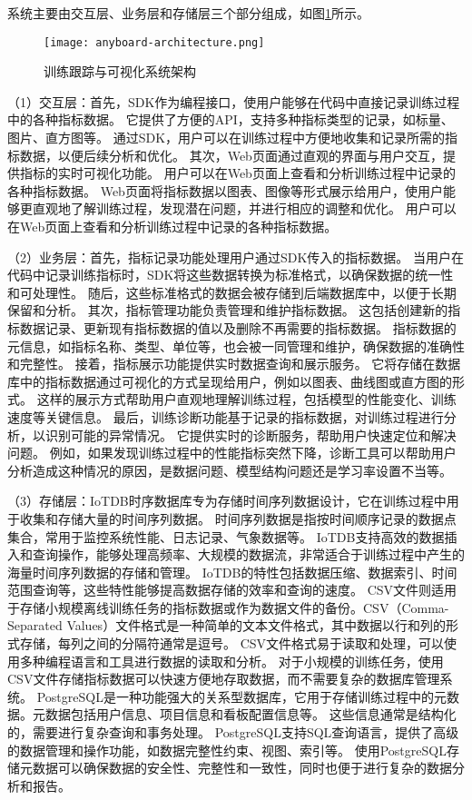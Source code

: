 系统主要由交互层、业务层和存储层三个部分组成，如图\ref{fig:anyboardarch}所示。

\begin{figure}
  \centering
  \texttt{[image: anyboard-architecture.png]}
  \caption{训练跟踪与可视化系统架构}
  \label{fig:anyboardarch}
\end{figure}

（1）交互层：首先，SDK作为编程接口，使用户能够在代码中直接记录训练过程中的各种指标数据。
它提供了方便的API，支持多种指标类型的记录，如标量、图片、直方图等。
通过SDK，用户可以在训练过程中方便地收集和记录所需的指标数据，以便后续分析和优化。
其次，Web页面通过直观的界面与用户交互，提供指标的实时可视化功能。
用户可以在Web页面上查看和分析训练过程中记录的各种指标数据。
Web页面将指标数据以图表、图像等形式展示给用户，使用户能够更直观地了解训练过程，发现潜在问题，并进行相应的调整和优化。
用户可以在Web页面上查看和分析训练过程中记录的各种指标数据。

（2）业务层：首先，指标记录功能处理用户通过SDK传入的指标数据。
当用户在代码中记录训练指标时，SDK将这些数据转换为标准格式，以确保数据的统一性和可处理性。
随后，这些标准格式的数据会被存储到后端数据库中，以便于长期保留和分析。
其次，指标管理功能负责管理和维护指标数据。
这包括创建新的指标数据记录、更新现有指标数据的值以及删除不再需要的指标数据。
指标数据的元信息，如指标名称、类型、单位等，也会被一同管理和维护，确保数据的准确性和完整性。
接着，指标展示功能提供实时数据查询和展示服务。
它将存储在数据库中的指标数据通过可视化的方式呈现给用户，例如以图表、曲线图或直方图的形式。
这样的展示方式帮助用户直观地理解训练过程，包括模型的性能变化、训练速度等关键信息。
最后，训练诊断功能基于记录的指标数据，对训练过程进行分析，以识别可能的异常情况。
它提供实时的诊断服务，帮助用户快速定位和解决问题。
例如，如果发现训练过程中的性能指标突然下降，诊断工具可以帮助用户分析造成这种情况的原因，是数据问题、模型结构问题还是学习率设置不当等。

（3）存储层：IoTDB时序数据库\cite{Wan23}专为存储时间序列数据设计，它在训练过程中用于收集和存储大量的时间序列数据。
时间序列数据是指按时间顺序记录的数据点集合，常用于监控系统性能、日志记录、气象数据等。
IoTDB支持高效的数据插入和查询操作，能够处理高频率、大规模的数据流，非常适合于训练过程中产生的海量时间序列数据的存储和管理。
IoTDB的特性包括数据压缩、数据索引、时间范围查询等，这些特性能够提高数据存储的效率和查询的速度。
CSV文件则适用于存储小规模离线训练任务的指标数据或作为数据文件的备份。CSV（Comma-Separated Values）文件格式是一种简单的文本文件格式，其中数据以行和列的形式存储，每列之间的分隔符通常是逗号。
CSV文件格式易于读取和处理，可以使用多种编程语言和工具进行数据的读取和分析。
对于小规模的训练任务，使用CSV文件存储指标数据可以快速方便地存取数据，而不需要复杂的数据库管理系统。
PostgreSQL是一种功能强大的关系型数据库，它用于存储训练过程中的元数据。元数据包括用户信息、项目信息和看板配置信息等。
这些信息通常是结构化的，需要进行复杂查询和事务处理。
PostgreSQL支持SQL查询语言，提供了高级的数据管理和操作功能，如数据完整性约束、视图、索引等。
使用PostgreSQL存储元数据可以确保数据的安全性、完整性和一致性，同时也便于进行复杂的数据分析和报告。

